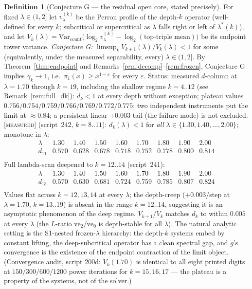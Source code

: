 \documentclass[11pt]{article}
\theoremstyle{definition}
\newtheorem{definition}[theorem]{Definition}
\newcommand{\MEASURED}{\textup{[\textsc{measured}]}}
\newcommand{\Var}{\mathrm{Var}}
\newcommand{\lam}{\lambda}
\begin{document}
\begin{definition}[Conjecture G --- the residual open core, stated
precisely]\label{conj:G}
For fixed $\lam \in (1, 2]$ let $v^{(k)}_\lam$ be the Perron profile of
the depth-$k$ operator (well-defined for every $k$; subcritical or
supercritical as $\lam$ falls right or left of $\lam^*(k)$), and let
$V_k(\lam) = \Var_{\mathrm{count}}\big(\log_2 v^{(k)}_\lam -
\log_2(\text{top-triple mean})\big)$ be its endpoint tower variance.
\emph{Conjecture G:} $\limsup_k V_{k+1}(\lam)/V_k(\lam) < 1$ for some
(equivalently, under the measured separability, every) $\lam \in
(1,2]$. By Theorem~\ref{thm:endpoint} and
Remarks~\ref{rem:decomp}--\ref{rem:frozen}, Conjecture G implies
$\gamma_k \to 1$, i.e.\ $\pi_1(x) \ge x^{1-\varepsilon}$ for every
$\varepsilon$. Status: measured $d$-column at $\lam = 1.70$ through $k = 19$, including
the shallow regime $k=4..12$ (see Remark~\ref{rem:full_dk}): $d_k < 1$
at every depth without exception; plateau values $0.756/0.754/0.759/0.766/0.769/0.772/0.775$;
two independent instruments put the limit at $\approx 0.84$; a persistent linear
$+0.003$ tail (the failure mode) is not excluded.
\MEASURED{} (script~242, $k{=}8..11$):
$d_k(\lam) < 1$ for \emph{all}
$\lam \in \{1.30, 1.40, \ldots, 2.00\}$; monotone in $\lam$:
\[
\begin{array}{r|cccccccc}
\lam & 1.30 & 1.40 & 1.50 & 1.60 & 1.70 & 1.80 & 1.90 & 2.00 \\
\hline
d_{11} & 0.570 & 0.628 & 0.678 & 0.718 & 0.752 & 0.778 & 0.800 & 0.814 \\
\end{array}
\]
Full lambda-scan deepened to $k{=}12..14$ (script~241):
\[
\begin{array}{r|cccccccc}
\lam & 1.30 & 1.40 & 1.50 & 1.60 & 1.70 & 1.80 & 1.90 & 2.00 \\
\hline
d_{13} & 0.570 & 0.630 & 0.681 & 0.724 & 0.759 & 0.785 & 0.807 & 0.824 \\
\end{array}
\]
Values flat across $k{=}12,13,14$ at every $\lambda$; the depth-creep ($+0.003$/step
at $\lambda{=}1.70$, $k{=}13..19$) is absent in the range $k{=}12..14$, suggesting
it is an asymptotic phenomenon of the deep regime.
$V_{k+1}/V_k$ matches $d_k$ to within $0.005$ at every $\lam$
(the $L$-ratio $\mathrm{ve}_2/\mathrm{ve}_0$ is depth-stable for all $\lam$). The natural analytic
setting is the S1-nested frozen-$\lam$ hierarchy: the depth-$k$ systems
embed by constant lifting, the deep-subcritical operator has a clean
spectral gap, and $g$'s convergence is the existence of the endpoint
contraction of the limit object.
(Convergence audit, script 200d: $V_k(1.70)$ is identical to all eight
printed digits at $150/300/600/1200$ power iterations for
$k = 15,16,17$ --- the plateau is a property of the systems, not of the
solver.)
\end{definition}
\end{document}
